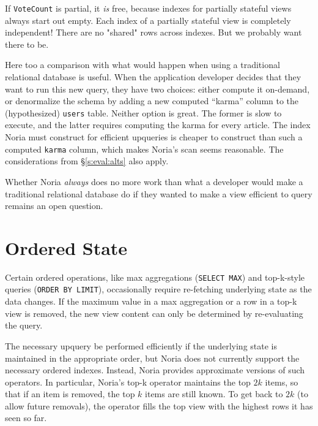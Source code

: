 \begin{inprogress}
  If \texttt{VoteCount} is partial, it \emph{is} free, because indexes for
  partially stateful views always start out empty. Each index of a partially
  stateful view is completely independent! There are no "shared" rows across
  indexes. But we probably want there to be.
\end{inprogress}

Here too a comparison with what would happen when using a traditional relational
database is useful. When the application developer decides that they want to run
this new query, they have two choices: either compute it on-demand, or
denormalize the schema by adding a new computed ``karma'' column to the
(hypothesized) \texttt{users} table. Neither option is great. The former is slow
to execute, and the latter requires computing the karma for every article.
The index Noria must construct for efficient upqueries is cheaper to construct
than such a computed \texttt{karma} column, which makes Noria's scan seems
reasonable. The considerations from \S\ref{s:eval:alts} also apply.


Whether Noria \emph{always} does no more work than what a developer would
make a traditional relational database do if they wanted to make a view
efficient to query remains an open question.

\section{Ordered State}

Certain ordered operations, like max aggregations (\texttt{SELECT MAX}) and
top-k-style queries (\texttt{ORDER BY LIMIT}), occasionally require re-fetching
underlying state as the data changes. If the maximum value in a max aggregation
or a row in a top-k view is removed, the new view content can only be determined
by re-evaluating the query.

The necessary upquery be performed efficiently if the underlying state is
maintained in the appropriate order, but Noria does not currently support the
necessary ordered indexes. Instead, Noria provides approximate versions of such
operators. In particular, Noria's top-k operator maintains the top $2k$ items,
so that if an item is removed, the top $k$ items are still known. To get back to
$2k$ (to allow future removals), the operator fills the top view with the
highest rows it has seen so far.

